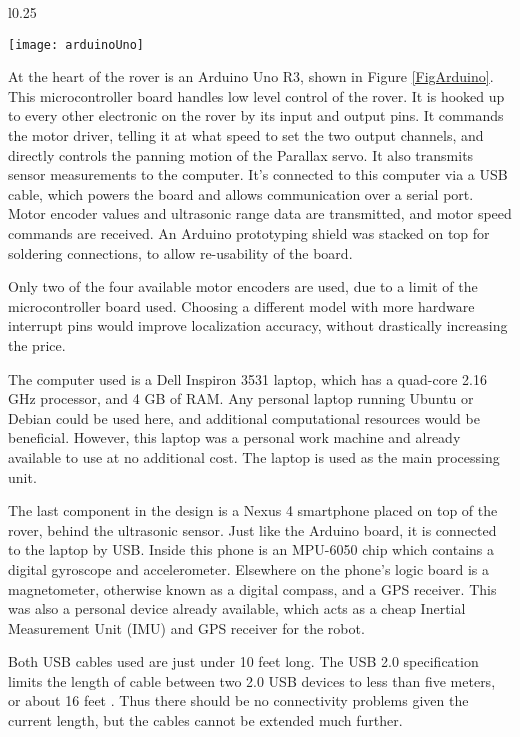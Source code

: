 \begin{wrapfigure}{l}{0.25\textwidth}
	\caption{\cite{fig_arduino_uno}}
	\centering
	\texttt{[image: arduinoUno]}
	\label{FigArduino}
\end{wrapfigure}

At the heart of the rover is an Arduino Uno R3, shown in Figure \ref{FigArduino}. This microcontroller board handles low level control of the rover. It is hooked up to every other electronic on the rover by its input and output pins. It commands the motor driver, telling it at what speed to set the two output channels, and directly controls the panning motion of the Parallax servo. It also transmits sensor measurements to the computer. It's connected to this computer via a USB cable, which powers the board and allows communication over a serial port. Motor encoder values and ultrasonic range data are transmitted, and motor speed commands are received. An Arduino prototyping shield was stacked on top for soldering connections, to allow re-usability of the board.

Only two of the four available motor encoders are used, due to a limit of the microcontroller board used. Choosing a different model with more hardware interrupt pins would improve localization accuracy, without drastically increasing the price.

The computer used is a Dell Inspiron 3531 laptop, which has a quad-core 2.16 GHz processor, and 4 GB of RAM. Any personal laptop running Ubuntu or Debian could be used here, and additional computational resources would be beneficial. However, this laptop was a personal work machine and already available to use at no additional cost. The laptop is used as the main processing unit.

The last component in the design is a Nexus 4 smartphone placed on top of the rover, behind the ultrasonic sensor. Just like the Arduino board, it is connected to the laptop by USB. Inside this phone is an MPU-6050 chip which contains a digital gyroscope and accelerometer. Elsewhere on the phone's logic board is a magnetometer, otherwise known as a digital compass, and a GPS receiver. This was also a personal device already available, which acts as a cheap Inertial Measurement Unit (IMU) and GPS receiver for the robot.

Both USB cables used are just under 10 feet long. The USB 2.0 specification limits the length of cable between two 2.0 USB devices to less than five meters, or about 16 feet \cite{usbForum}. Thus there should be no connectivity problems given the current length, but the cables cannot be extended much further. 

